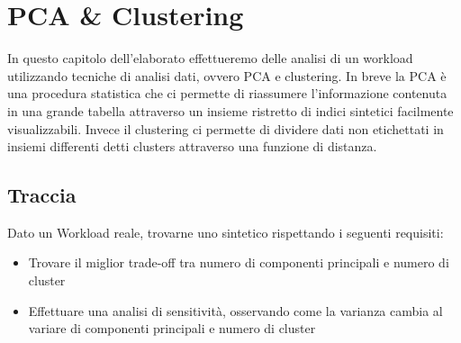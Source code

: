 \chapter{PCA \& Clustering}
In questo capitolo dell'elaborato effettueremo delle analisi di un workload utilizzando tecniche di analisi dati, ovvero PCA e clustering.
In breve la PCA è una procedura statistica che ci permette di riassumere l'informazione contenuta in una grande tabella attraverso un insieme ristretto di indici sintetici facilmente visualizzabili.
Invece il clustering ci permette di dividere dati non etichettati in insiemi differenti detti clusters attraverso una funzione di distanza.
\section{Traccia}
Dato un Workload reale, trovarne uno sintetico rispettando i seguenti requisiti: 

\begin{itemize}
    \item Trovare il miglior trade-off tra numero di componenti principali e numero di cluster
    \item Effettuare una analisi di sensitività, osservando come la varianza cambia al variare di componenti principali e numero di cluster
\end{itemize}
